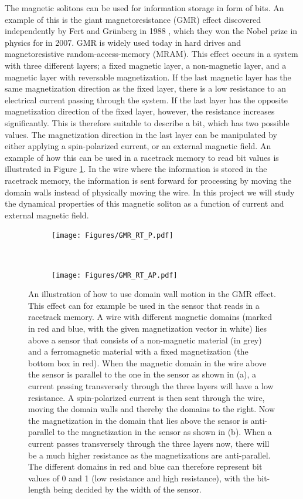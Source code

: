 \documentclass[12pt, a4paper, twoside, openright]{article}		%
\numberwithin{equation}{section}
\begin{document}
The magnetic solitons can be used for information storage in form of bits. An example of this is the giant magnetoresistance (GMR) effect discovered independently by Fert and Gr\"{u}nberg in 1988 \cite{Fert1988} \cite{Grunberg1989}, which they won the Nobel prize in physics for in 2007. GMR is widely used today in hard drives and magnetoresistive random-access-memory (MRAM). This effect occurs in a system with three different layers; a fixed magnetic layer, a non-magnetic layer, and a magnetic layer with reversable magnetization. If the last magnetic layer has the same magnetization direction as the fixed layer, there is a low resistance to an electrical current passing through the system. If the last layer has the opposite magnetization direction of the fixed layer, however, the resistance increases significantly. This is therefore suitable to describe a bit, which has two possible values. The magnetization direction in the last layer can be manipulated by either applying a spin-polarized current, or an external magnetic field. An example of how this can be used in a racetrack memory to read bit values is illustrated in Figure \ref{fig:GMR}. In the wire where the information is stored in the racetrack memory, the information is sent forward for processing by moving the domain walls instead of physically moving the wire. In this project we will study the dynamical properties of this magnetic soliton as a function of current and external magnetic field.

\begin{figure}[h!]
\centering
\begin{subfigure}{.7\textwidth}
  \centering
  \texttt{[image: Figures/GMR\_RT\_P.pdf]}
  \caption{}
\end{subfigure}\\
\begin{subfigure}{.7\textwidth}
  \centering
  \texttt{[image: Figures/GMR\_RT\_AP.pdf]}
  \caption{}
\end{subfigure}
\caption{An illustration of how to use domain wall motion in the GMR effect. This effect can for example be used in the sensor that reads in a racetrack memory. A wire with different magnetic domains (marked in red and blue, with the given magnetization vector in white) lies above a sensor that consists of a non-magnetic material (in grey) and a ferromagnetic material with a fixed magnetization (the bottom box in red). When the magnetic domain in the wire above the sensor is parallel to the one in the sensor as shown in (a), a current passing transversely through the three layers will have a low resistance. A spin-polarized current is then sent through the wire, moving the domain walls and thereby the domains to the right. Now the magnetization in the domain that lies above the sensor is anti-parallel to the magnetization in the sensor as shown in (b). When a current passes transversely through the three layers now, there will be a much higher resistance as the magnetizations are anti-parallel. The different domains in red and blue can therefore represent bit values of 0 and 1 (low resistance and high resistance), with the bit-length being decided by the width of the sensor.}
\label{fig:GMR}
\end{figure}
\end{document}
